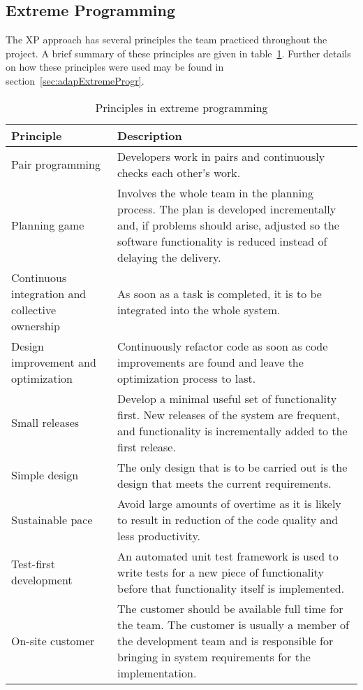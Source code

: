 \subsection{Extreme Programming}
The XP approach has several principles the team practiced throughout the project. A brief summary of these principles are given in table~\ref{tab:exProg}. Further details on how these principles were used may be found in section~\ref{sec:adapExtremeProgr}.

\begin{table}[H]
\begin{tabular}{|p{4cm}|p{11.7cm}|}
\hline
\textbf{Principle} & \textbf{Description} \\\hline
Pair programming & Developers work in pairs and continuously checks each other's work.\\\hline
Planning game & Involves the whole team in the planning process. The plan is developed incrementally and, if problems should arise, adjusted so the software functionality is reduced instead of delaying the delivery.
\\\hline
Continuous integration and collective ownership& As soon as a task is completed, it is to be integrated into the whole system.\\\hline
Design improvement and optimization & Continuously refactor code as soon as code improvements are found and leave the optimization process to last. \\\hline
Small releases & Develop a minimal useful set of functionality first. New releases of the system are frequent, and functionality is incrementally added to the first release.\\\hline
Simple design & The only design that is to be carried out is the design that meets the current requirements.\\\hline
Sustainable pace & Avoid large amounts of overtime as it is likely to result in reduction of the code quality and less productivity. \\\hline
Test-first development & An automated unit test framework is used to write tests for a new piece of functionality before that functionality itself is implemented. \\\hline
On-site customer & The customer should be available full time for the team. The customer is usually a member of the development team and is responsible for bringing in system requirements for the implementation.\\\hline
\end{tabular}
\caption{Principles in extreme programming}
\label{tab:exProg}
\end{table}
